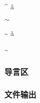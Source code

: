 \documentclass[twoside]{ctexart}
\begin{document}
            {\rmfamily {}}

            \^{} \^a

            $\sim$
            
            \~{} \~a
            
            \textasciitilde

        \subsubsection{导言区}

        \subsubsection{文件输出}
\end{document}
